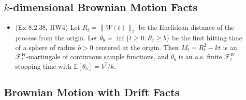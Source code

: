 \documentclass[twoside]{article}
\newcommand\bbE{\mathbb{E}}
\newcommand\calF{\mathcal{F}}
\def\t{\theta}
\begin{document}
\subsection*{$k$-dimensional Brownian Motion Facts}
\begin{itemize}
\item (Ex 8.2.38, HW4) Let $R_t = \| \underline{W}(t) \|_2$ be the Euclidean distance of the process from the origin. Let $\t_b = \inf\{ t \geq 0: R_t \geq b\}$ be the first hitting time of a sphere of radius $b > 0$ centered at the origin. Then $M_t = R_t^2 - kt$ is an $\calF_t^W$-martingale of continuous sample functions, and $\t_b$ is an a.s. finite $\calF_t^W$ stopping time with $\bbE [\t_b] = b^2/k$.
\end{itemize}

\subsection*{Brownian Motion with Drift Facts}
\end{document}
